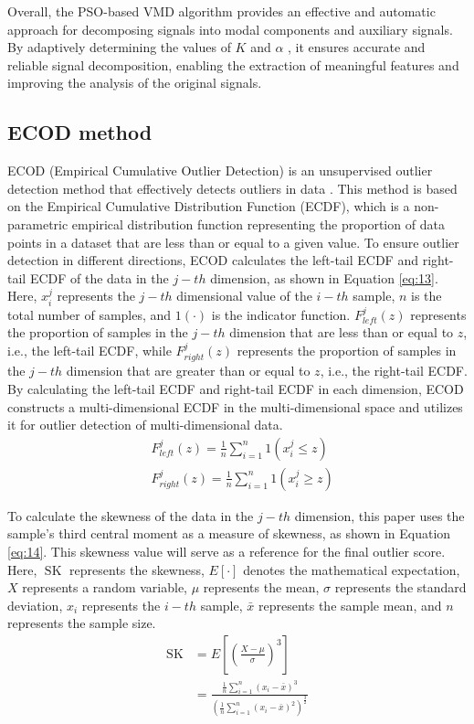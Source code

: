 \documentclass[3p,authoryear,preprint,12pt]{elsarticle}
\begin{document}
Overall, the PSO-based VMD algorithm provides an effective and automatic approach for decomposing signals into modal components and auxiliary signals. By adaptively determining the values of $K$  and {$\alpha$} , it ensures accurate and reliable signal decomposition, enabling the extraction of meaningful features and improving the analysis of the original signals.
\subsection{ECOD method}
ECOD (Empirical Cumulative Outlier Detection) is an unsupervised outlier detection method that effectively detects outliers in data \citep{LiECODUnsupervisedOutlier2022}. This method is based on the Empirical Cumulative Distribution Function (ECDF), which is a non-parametric empirical distribution function representing the proportion of data points in a dataset that are less than or equal to a given value. To ensure outlier detection in different directions, ECOD calculates the left-tail ECDF and right-tail ECDF of the data in the  $j-th$ dimension, as shown in Equation \ref{eq:13}. Here, $x_i^j$ represents the  $j-th$ dimensional value of the  $i-th$ sample, $n$  is the total number of samples, and $1(\cdot)$  is the indicator function. $F_{left}^j(z)$  represents the proportion of samples in the  $j-th$ dimension that are less than or equal to $z$, i.e., the left-tail ECDF, while  $F_{right}^j(z)$  represents the proportion of samples in the  $j-th$ dimension that are greater than or equal to $z$, i.e., the right-tail ECDF. By calculating the left-tail ECDF and right-tail ECDF in each dimension, ECOD constructs a multi-dimensional ECDF in the multi-dimensional space and utilizes it for outlier detection of multi-dimensional data.
\begin{equation}
	\label{eq:13}
	\begin{split}
		&F_{left}^j(z) =  \frac{1}{n}\sum_{i=1}^{n} 1 (x_i^j \leq z) \\
		&F_{right}^j(z) =  \frac{1}{n}\sum_{i=1}^{n} 1 (x_i^j \geq z) 
	\end{split}
\end{equation}

To calculate the skewness of the data in the  $j-th$ dimension, this paper uses the sample's third central moment as a measure of skewness, as shown in Equation \ref{eq:14}. This skewness value will serve as a reference for the final outlier score. Here, $\operatorname{SK}$  represents the skewness, $E\left[\cdot \right]$ denotes the mathematical expectation, $X$ represents a random variable,  $\mu$ represents the mean, $\sigma$  represents the standard deviation, $x_i$  represents the  $i-th$ sample,  $\bar{x}$ represents the sample mean, and {$n$} represents the sample size.
\begin{equation}
	\label{eq:14}
	\begin{split}
		\operatorname{SK}
		& = E\left[ \left( \frac{X-\mu}{\sigma}\right)^3 \right]  \\
		&= \frac{\frac{1}{n} \sum_{i=1}^{n} (x_i - \bar{x})^3}{\left(\frac{1}{n} \sum_{i=1}^{n} (x_i - \bar{x})^2\right)^{\frac{3}{2}}}
	\end{split}
\end{equation} 
\end{document}
